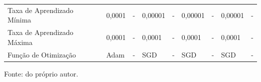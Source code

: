 \begin{table}[H]
{\begin{tabular}{l|l|l|l|l|l|l|l|l}
            Taxa de Aprendizado Mínima                   & 0,0001                             & -                       & 0,00001                            & -                       & 0,00001                            & -                       & 0,00001                            & -                                                                  \\
            Taxa de Aprendizado Máxima                   & 0,0001                             & -                       & 0,0001                             & -                       & 0,0001                             & -                       & 0,0001                             & -                                                                  \\
            Função de Otimização                         & Adam                               & -                       & SGD                                & -                       & SGD                                & -                       & SGD                                & -                       
        \end{tabular}
        }

    \vspace*{1 cm}
    Fonte: do próprio autor.
\end{table}


